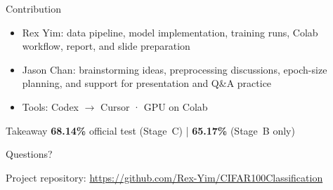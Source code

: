 \documentclass[aspectratio=169]{beamer}
\begin{document}
\begin{frame}{Contribution}
    \begin{itemize}
        \item Rex Yim: data pipeline, model implementation, training runs, Colab workflow, report, and slide preparation
        \item Jason Chan: brainstorming ideas, preprocessing discussions, epoch-size planning, and support for presentation and Q\&A practice
        \item Tools: Codex $\rightarrow$ Cursor · GPU on Colab
    \end{itemize}
\end{frame}

\begin{frame}{Takeaway}
 \centering
 \Large
 \textbf{68.14\%} official test (Stage~C) \quad | \quad \textbf{65.17\%} (Stage~B only)

 \vspace{1.2em}
 \normalsize
 Questions?

 \vspace{1em}
 {\footnotesize Project repository: \url{https://github.com/Rex-Yim/CIFAR100Classification}}
\end{frame}
\end{document}
